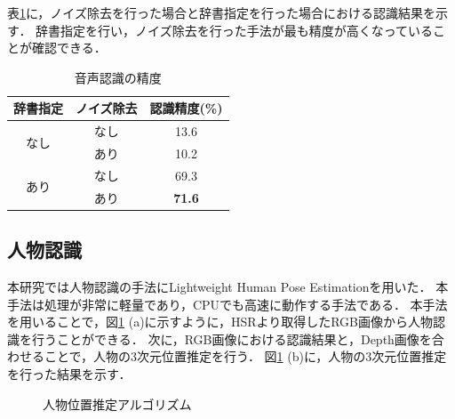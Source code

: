 \documentclass[a4j]{jarticle}
\begin{document}
表\ref{voice_recognition_result}に，ノイズ除去を行った場合と辞書指定を行った場合における認識結果を示す．
辞書指定を行い，ノイズ除去を行った手法が最も精度が高くなっていることが確認できる．
\begin{table}[ht]
	\centering
	\caption{音声認識の精度}
	\begin{tabular}{|c|c|c|}
	\hline
	辞書指定                & ノイズ除去 & 認識精度(\%)          \\ \hline
	\multirow{2}{*}{なし} & なし    & 13.6          \\ \cline{2-3}
	                    & あり    & 10.2          \\ \hline
	\multirow{2}{*}{あり} & なし    & 69.3          \\ \cline{2-3}
	                    & あり    & \textbf{71.6} \\ \hline
	\end{tabular}
	\label{voice_recognition_result}
\end{table}

\subsection{人物認識}
本研究では人物認識の手法にLightweight Human Pose Estimation\cite{light-openpose}を用いた．
本手法は処理が非常に軽量であり，CPUでも高速に動作する手法である．
本手法を用いることで，図\ref{human_estimation_explain} (a)に示すように，HSRより取得したRGB画像から人物認識を行うことができる．
次に，RGB画像における認識結果と，Depth画像を合わせることで，人物の3次元位置推定を行う．
図\ref{human_estimation_explain} (b)に，人物の3次元位置推定を行った結果を示す．
\begin{figure}[b]
  \centering
  \caption{人物位置推定アルゴリズム}
  \label{human_estimation_explain}
\end{figure}
\end{document}
